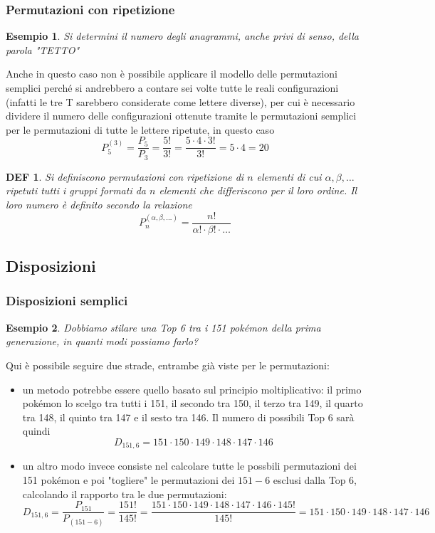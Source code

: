 \documentclass{article}     %
\newtheorem*{definition}{DEF}
\newtheorem{ex}{Esempio}[section]
\begin{document}
            \subsubsection{Permutazioni con ripetizione} 
            \begin{ex}
                Si determini il numero degli anagrammi, anche privi di senso, della parola "TETTO"
                
            \end{ex}
            Anche in questo caso non è possibile applicare il modello delle permutazioni semplici perché si andrebbero a contare sei volte tutte le reali configurazioni (infatti le tre T sarebbero considerate come lettere diverse), per cui è necessario dividere il numero delle configurazioni ottenute tramite le permutazioni semplici per le permutazioni di tutte le lettere ripetute, in questo caso \[P_5^{(3)}=\frac{P_5}{P_3}=\frac{5!}{3!}=\frac{5\cdot4\cdot3!}{3!}=5\cdot4=20\]

            \begin{definition}
                Si definiscono permutazioni con ripetizione di $n$ elementi di cui $\alpha, \beta, \dots$ ripetuti tutti i gruppi formati da $n$ elementi che differiscono per il loro ordine. Il loro numero è definito secondo la relazione \[P_n^{(\alpha, \beta, \dots)}=\frac{n!}{\alpha! \cdot \beta! \cdot \dots}\]
            \end{definition}
            
            \subsection{Disposizioni}
            \subsubsection{Disposizioni semplici}
            \begin{ex}
                Dobbiamo stilare una Top 6 tra i 151 pokémon della prima generazione, in quanti modi possiamo farlo?
                
            \end{ex} 
            Qui è possibile seguire due strade, entrambe già viste per le permutazioni: 
            \begin{itemize}
                \item un metodo potrebbe essere quello basato sul principio moltiplicativo: il primo pokémon lo scelgo tra tutti i 151, il secondo tra 150, il terzo tra 149, il quarto tra 148, il quinto tra 147 e il sesto tra 146. Il numero di possibili Top 6 sarà quindi \[D_{151,6}=151\cdot150\cdot149\cdot148\cdot147\cdot146\]
                \item un altro modo invece consiste nel calcolare tutte le possbili permutazioni dei 151 pokémon e poi "togliere" le permutazioni dei $151-6$ esclusi dalla Top 6, calcolando il rapporto tra le due permutazioni: \[D_{151,6}=\frac{P_{151}}{P_{(151-6)}}=\frac{151!}{145!}=\frac{151\cdot150\cdot149\cdot148\cdot147\cdot146\cdot145!}{145!}=151\cdot150\cdot149\cdot148\cdot147\cdot146\]
            \end{itemize}
\end{document}
